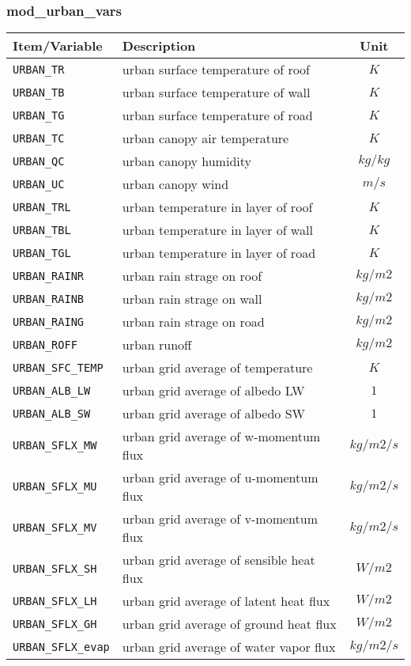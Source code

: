 \subsubsection{mod\_urban\_vars}
 \begin{tabularx}{150mm}{|l|X|c|} \hline
 \rowcolor[gray]{0.9} Item/Variable & Description  & Unit \\\hline
  \verb|URBAN_TR|    & urban surface temperature of roof  & $K$ \\\hline
  \verb|URBAN_TB|    & urban surface temperature of wall  & $K$ \\\hline
  \verb|URBAN_TG|    & urban surface temperature of road  & $K$ \\\hline
  \verb|URBAN_TC|    & urban canopy air temperature       & $K$ \\\hline
  \verb|URBAN_QC|    & urban canopy humidity              & $kg/kg$ \\\hline
  \verb|URBAN_UC|    & urban canopy wind                  & $m/s$ \\\hline
  \verb|URBAN_TRL|   & urban temperature in layer of roof & $K$ \\\hline
  \verb|URBAN_TBL|   & urban temperature in layer of wall & $K$ \\\hline
  \verb|URBAN_TGL|   & urban temperature in layer of road & $K$ \\\hline
  \verb|URBAN_RAINR| & urban rain strage on roof          & $kg/m2$ \\\hline
  \verb|URBAN_RAINB| & urban rain strage on wall          & $kg/m2$ \\\hline
  \verb|URBAN_RAING| & urban rain strage on road          & $kg/m2$ \\\hline
  \verb|URBAN_ROFF|  & urban runoff                       & $kg/m2$ \\\hline
  \verb|URBAN_SFC_TEMP| & urban grid average of temperature  & $K$ \\\hline
  \verb|URBAN_ALB_LW|   & urban grid average of albedo LW    & $1$ \\\hline
  \verb|URBAN_ALB_SW|   & urban grid average of albedo SW    & $1$ \\\hline
  \verb|URBAN_SFLX_MW|  & urban grid average of w-momentum flux    & $kg/m2/s$ \\\hline
  \verb|URBAN_SFLX_MU|  & urban grid average of u-momentum flux    & $kg/m2/s$ \\\hline
  \verb|URBAN_SFLX_MV|  & urban grid average of v-momentum flux    & $kg/m2/s$ \\\hline
  \verb|URBAN_SFLX_SH|  & urban grid average of sensible heat flux & $W/m2$ \\\hline
  \verb|URBAN_SFLX_LH|  & urban grid average of latent heat flux   & $W/m2$ \\\hline
  \verb|URBAN_SFLX_GH|  & urban grid average of ground heat flux   & $W/m2$ \\\hline
  \verb|URBAN_SFLX_evap| & urban grid average of water vapor flux  & $kg/m2/s$ \\\hline
 \end{tabularx}

